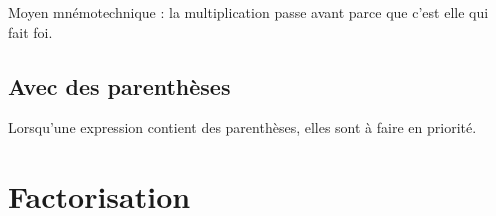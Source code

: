 Moyen mnémotechnique : la multiplication passe avant parce que c'est elle qui fait foi.

\subsection{Avec des parenthèses}

\begin{Aretenir}
    Lorsqu'une expression contient des parenthèses, elles sont à faire en priorité.
\end{Aretenir}

\section{Factorisation}




